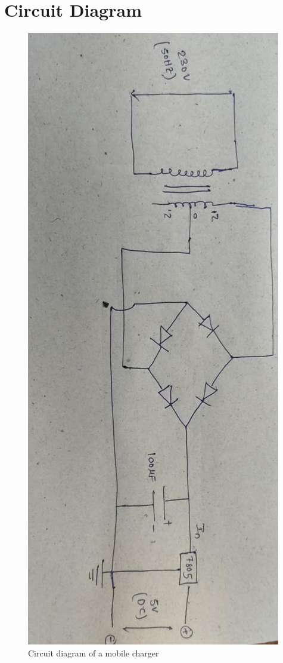 \documentclass[journal,12pt,twocolumn]{IEEEtran}
\begin{document}
	\section{Circuit Diagram}
	\begin{figure}[!ht]
		\centering
		\includegraphics[scale = 0.2]{./figs/circuit.jpeg}
		\caption{Circuit diagram of a mobile charger}
		\label{fig-ckt}	
	\end{figure}
	
\end{document}
